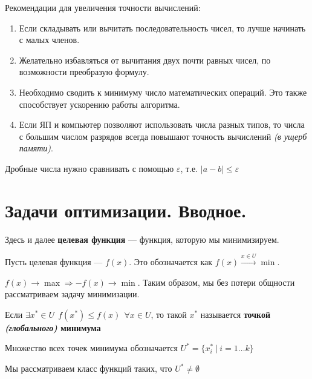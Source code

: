 Рекомендации для увеличения точности вычислений:
\begin{enumerate}
    \item Если складывать или вычитать последовательность чисел, то лучше начинать с малых членов. %
    \item Желательно избавляться от вычитания двух почти равных чисел, по возможности преобразую формулу.
    \item Необходимо сводить к минимуму число математических операций. Это также способствует ускорению работы алгоритма.
    \item Если ЯП и компьютер позволяют использовать числа разных типов, то числа с большим числом разрядов всегда повышают точность вычислений \textit{(в ущерб памяти)}. %
\end{enumerate}

Дробные числа нужно сравнивать с помощью \(\varepsilon\), т.е. \(|a - b| \leq \varepsilon\)

\section{Задачи оптимизации. Вводное.}

Здесь и далее \textbf{целевая функция} --- функция, которую мы минимизируем.

\begin{obozn}
    Пусть целевая функция --- \(f(x)\). Это обозначается как \(f(x) \xrightarrow{x\in U} \min\).

    \(f(x) \to \max \Rightarrow - f(x) \to \min\). Таким образом, мы без потери общности рассматриваем задачу минимизации.
\end{obozn}

\begin{definition}
    Если \(\exists x^* \in U \ \ f(x^*) \leq f(x) \ \ \forall x\in U\), то такой \(x^*\) называется \textbf{точкой \textit{(глобального)} минимума}
\end{definition}

\begin{obozn}
    Множество всех точек минимума обозначается \(U^* = \{x^*_i\ |\ i = 1\dots k\} \)
\end{obozn}

Мы рассматриваем класс функций таких, что \(U^* \neq \emptyset\)


